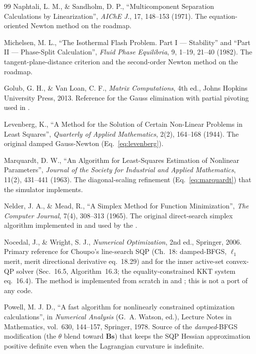 \documentclass[11pt,a4paper]{article}
\newcommand{\Bv}{\mathbf{B}}                          %
\begin{document}
\begin{thebibliography}{99}
 Naphtali, L. M., \& Sandholm, D. P., ``Multicomponent
Separation Calculations by Linearization'', \emph{AIChE J.}, 17,
148--153 (1971). The equation-oriented Newton method on the roadmap.

 Michelsen, M. L., ``The Isothermal Flash Problem.
Part I --- Stability'' and ``Part II --- Phase-Split Calculation'',
\emph{Fluid Phase Equilibria}, 9, 1--19, 21--40 (1982). The
tangent-plane-distance criterion and the second-order Newton method
on the roadmap.

 Golub, G. H., \& Van Loan, C. F.,
\emph{Matrix Computations}, 4th ed., Johns Hopkins University Press,
2013. Reference for the Gauss elimination with partial pivoting used
in .

 Levenberg, K., ``A Method for the Solution of
Certain Non-Linear Problems in Least Squares'', \emph{Quarterly of
Applied Mathematics}, 2(2), 164--168 (1944). The original damped
Gauss-Newton (Eq.~\ref{eq:levenberg}).

 Marquardt, D. W., ``An Algorithm for Least-Squares
Estimation of Nonlinear Parameters'', \emph{Journal of the Society for
Industrial and Applied Mathematics}, 11(2), 431--441 (1963). The
diagonal-scaling refinement (Eq.~\ref{eq:marquardt}) that the simulator
implements.

 Nelder, J. A., \& Mead, R., ``A Simplex Method
for Function Minimization'', \emph{The Computer Journal}, 7(4),
308--313 (1965). The original direct-search simplex algorithm
implemented in  and used by the .

 Nocedal, J., \& Wright, S. J., \emph{Numerical
Optimization}, 2nd ed., Springer, 2006. Primary reference for Choupo's
line-search SQP (Ch.~18: damped-BFGS, $\ell_1$ merit, merit directional
derivative eq.~18.29) and for the inner active-set convex-QP solver
(Sec.~16.5, Algorithm~16.3; the equality-constrained KKT system eq.~16.4).
The method is implemented from scratch in  and
; this is not a port of any code.

 Powell, M. J. D., ``A fast algorithm for nonlinearly
constrained optimization calculations'', in \emph{Numerical Analysis}
(G.~A. Watson, ed.), Lecture Notes in Mathematics, vol.~630, 144--157,
Springer, 1978. Source of the \emph{damped}-BFGS modification (the
$\theta$ blend toward $\Bv\mathbf s$) that keeps the SQP Hessian
approximation positive definite even when the Lagrangian curvature is
indefinite.


\end{thebibliography}
\end{document}
